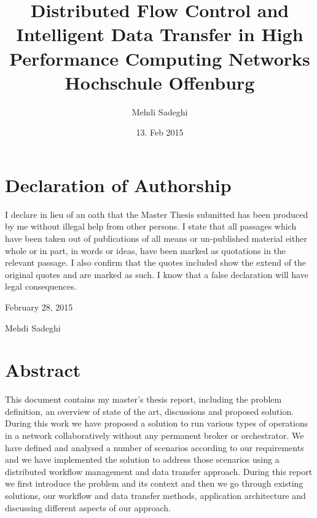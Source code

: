 \documentclass[12pt, a4paper]{report}
\title{
      {Distributed Flow Control and Intelligent Data Transfer in High Performance Computing Networks}\\
      {\large Hochschule Offenburg}
}
\author{Mehdi Sadeghi}
\date{13. Feb 2015}
\begin{document}
\nocite{*} %

\maketitle



\chapter*{Declaration of Authorship}
\noindent
I declare in lieu of an oath that the Master Thesis submitted has been produced by me without illegal help
from other persons. I state that all passages which have been taken out of publications of all means or un-published
material either whole or in part, in words or ideas, have been marked as quotations in the relevant passage. 
I also confirm that the quotes included show the extend of the original quotes and are marked
as such. I know that a false declaration will have legal consequences. 


February 28, 2015

Mehdi Sadeghi

\chapter*{Abstract}
This document contains my master's thesis report, including the problem definition,
an overview of state of the art, discussions and proposed solution.
During this work we have proposed a solution to run various types of operations in a network collaboratively without any permanent broker or orchestrator. 
We have defined and analysed a number of scenarios according to our requirements 
and we have implemented the solution to address those scenarios using a distributed workflow management and data transfer approach. 
During this report we first introduce the problem and its context and then we go through existing solutions,
our workflow and data transfer methods, application architecture and discussing different aspects of our approach.
\end{document}
